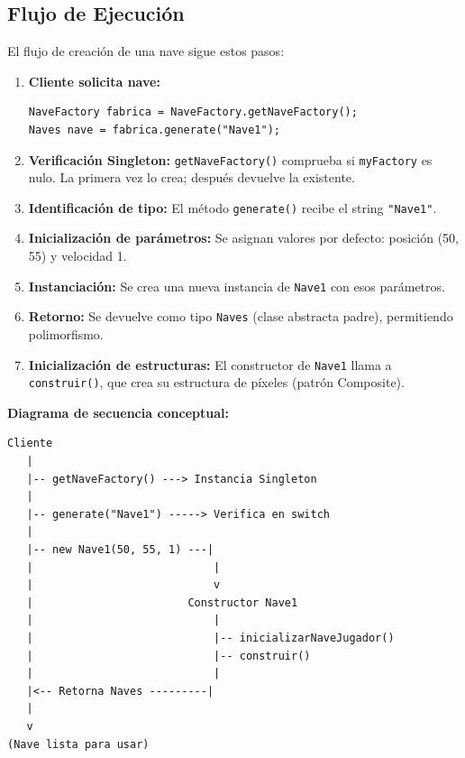 \documentclass[12pt]{article}
\begin{document}
\subsection{Flujo de Ejecución}

El flujo de creación de una nave sigue estos pasos:

\begin{enumerate}
    \item \textbf{Cliente solicita nave:}
    \begin{lstlisting}
NaveFactory fabrica = NaveFactory.getNaveFactory();
Naves nave = fabrica.generate("Nave1");
    \end{lstlisting}
    
    \item \textbf{Verificación Singleton:} \texttt{getNaveFactory()} comprueba si \texttt{myFactory} es nulo. La primera vez lo crea; después devuelve la existente.
    
    \item \textbf{Identificación de tipo:} El método \texttt{generate()} recibe el string \texttt{"Nave1"}.
    
    \item \textbf{Inicialización de parámetros:} Se asignan valores por defecto: posición (50, 55) y velocidad 1.
    
    \item \textbf{Instanciación:} Se crea una nueva instancia de \texttt{Nave1} con esos parámetros.
    
    \item \textbf{Retorno:} Se devuelve como tipo \texttt{Naves} (clase abstracta padre), permitiendo polimorfismo.
    
    \item \textbf{Inicialización de estructuras:} El constructor de \texttt{Nave1} llama a \texttt{construir()}, que crea su estructura de píxeles (patrón Composite).
\end{enumerate}

\textbf{Diagrama de secuencia conceptual:}

\begin{verbatim}
Cliente
   |
   |-- getNaveFactory() ---> Instancia Singleton
   |
   |-- generate("Nave1") -----> Verifica en switch
   |
   |-- new Nave1(50, 55, 1) ---|
   |                            |
   |                            v
   |                        Constructor Nave1
   |                            |
   |                            |-- inicializarNaveJugador()
   |                            |-- construir()
   |                            |
   |<-- Retorna Naves ---------|
   |
   v
(Nave lista para usar)
\end{verbatim}
\end{document}
